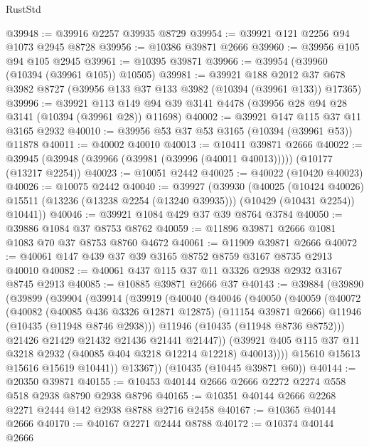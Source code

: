 \begin{lexlean}{RustStd}
\begin{coremodule}
@39948 := @39916 @2257 @39935 @8729
@39954 := @39921 @121 @2256 @94 @1073 @2945 @8728
@39956 := @10386 @39871 @2666
@39960 := @39956 @105 @94 @105 @2945
@39961 := @10395 @39871
@39966 := @39954 (@39960 (@10394 (@39961 @105)) @10505)
@39981 := @39921
    @188
    @2012
    @37
    @678
    @3982
    @8727
    (@39956 @133 @37 @133 @3982 (@10394 (@39961 @133)) @17365)
@39996 := @39921
    @113
    @149
    @94
    @39
    @3141
    @4478
    (@39956 @28 @94 @28 @3141 (@10394 (@39961 @28)) @11698)
@40002 := @39921 @147 @115 @37 @11 @3165 @2932
@40010 := @39956 @53 @37 @53 @3165 (@10394 (@39961 @53)) @11878
@40011 := @40002 @40010
@40013 := @10411 @39871 @2666
@40022 := @39945 (@39948 (@39966 (@39981 (@39996 (@40011 @40013))))) (@10177 (@13217 @2254))
@40023 := @10051 @2442
@40025 := @40022 (@10420 @40023)
@40026 := @10075 @2442
@40040 := @39927
    (@39930
      (@40025
        (@10424 @40026)
        @15511
        (@13236 (@13238 @2254 (@13240 @39935)))
        (@10429 (@10431 @2254))
        @10441))
@40046 := @39921 @1084 @429 @37 @39 @8764 @3784
@40050 := @39886 @1084 @37 @8753 @8762
@40059 := @11896 @39871 @2666 @1081 @1083 @70 @37 @8753 @8760 @4672
@40061 := @11909 @39871 @2666
@40072 := @40061 @147 @439 @37 @39 @3165 @8752 @8759 @3167 @8735 @2913 @40010
@40082 := @40061 @437 @115 @37 @11 @3326 @2938 @2932 @3167 @8745 @2913
@40085 := @10885 @39871 @2666 @37
@40143 := @39884
    (@39890
      (@39899
        (@39904
          (@39914
            (@39919
              (@40040
                (@40046
                  (@40050
                    (@40059
                      (@40072
                        (@40082
                          (@40085 @436 @3326 @12871 @12875)
                          (@11154 @39871 @2666)
                          @11946
                          (@10435 (@11948 @8746 @2938)))
                        @11946
                        (@10435 (@11948 @8736 @8752)))
                      @21426
                      @21429
                      @21432
                      @21436
                      @21441
                      @21447))
                  (@39921 @405 @115 @37 @11 @3218 @2932 (@40085 @404 @3218 @12214 @12218) @40013))))
            @15610
            @15613
            @15616
            @15619
            @10441))
        @13367))
    (@10435 (@10445 @39871 @60))
@40144 := @20350 @39871
@40155 := @10453 @40144 @2666 @2666 @2272 @2274 @558 @518 @2938 @8790 @2938 @8796
@40165 := @10351 @40144 @2666 @2268 @2271 @2444 @142 @2938 @8788 @2716 @2458
@40167 := @10365 @40144 @2666
@40170 := @40167 @2271 @2444 @8788
@40172 := @10374 @40144 @2666

\end{coremodule}
\end{lexlean}
